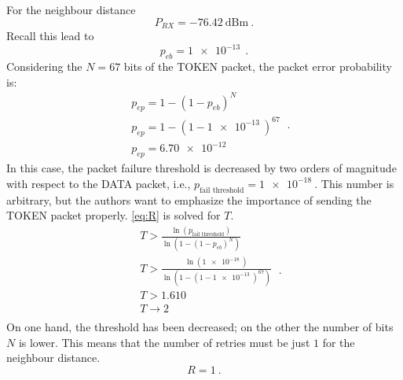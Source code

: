 For the neighbour distance
\begin{equation}
		P_{RX} = - \SI{76.42}{\dB}\text{m} \ .
\end{equation}
Recall this lead to
\begin{equation}
	p_{eb} = \SI{1e-13}{} \ .
\end{equation}
Considering the $N = 67$ bits of the TOKEN packet, the packet error probability is:
\begin{equation}
	\begin{split}
		& p_{ep} = 1 - \left( 1 - p_{eb} \right)^N \\
		& p_{ep} = 1 - \left( 1 - \SI{1e-13}{} \right)^{67} \\
		& p_{ep} = \SI{6.70e-12}{}
	\end{split} \ .
\end{equation}
In this case, the packet failure threshold is decreased by two orders of magnitude with respect to the DATA packet, i.e., $p_{\text{fail threshold}} = \SI{1e-18}{}$. This number is arbitrary, but the authors want to emphasize the importance of sending the TOKEN packet properly. \eqref{eq:R} is solved for $T$.
\begin{equation}
	\begin{split}
		& T > \frac{\ln \left( p_{\text{fail threshold}}  \right) }{\ln \left( 1 - \left( 1 - p_{eb} \right)^N \right) } \\
		& T > \frac{\ln \left( \SI{1e-18}{} \right) }{\ln \left( 1 - \left( 1 - \SI{1e-13}{} \right)^{67} \right) } \\
		& T > 1.610 \\
		& T \rightarrow 2 \\
	\end{split} \ .
\end{equation}
On one hand, the threshold has been decreased; on the other the number of bits $N$ is lower. This means that the number of retries must be just $1$ for the neighbour distance.
\begin{equation}
	R = 1 \ .
\end{equation}



